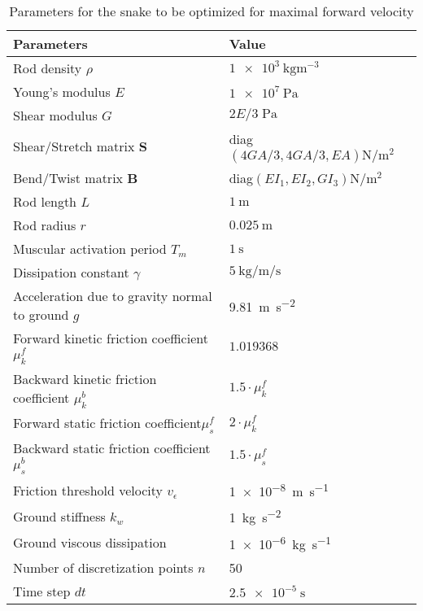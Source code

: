 \documentclass[11pt]{article}
\begin{document}
\begin{table}[htbp]
\caption{\label{tab_opt_snake_params}
Parameters for the snake to be optimized for maximal forward velocity}
\centering
\begin{tabular}{ll}
\toprule
Parameters & Value\\
\midrule
Rod density \(\rho\) & \(\SI{1e3}{\kg \m^{-3}}\)\\
Young's modulus \(E\) & \(\SI{1e7}{\Pa}\)\\
Shear modulus \(G\) & \(2E/3\;\si{\Pa}\)\\
Shear/Stretch matrix \(\mathbf{S}\) & diag\((4GA/3, 4GA/3, EA) \si{\N\per\m^2}\)\\
Bend/Twist matrix \(\mathbf{B}\) & diag\((EI_1, EI_2, GI_3) \si{\N\per\m^2}\)\\
Rod length \(L\) & \(\SI{1}{\m}\)\\
Rod radius \(r\) & \(\SI{0.025}{\m}\)\\
Muscular activation period \(T_m\) & \(\SI{1}{\second}\)\\
Dissipation constant \(\gamma\) & \(\SI{5}{\kg\per\m\per\second}\)\\
Acceleration due to gravity normal to ground \(g\) & \SI{9.81}{\m \per \s^2}\\
Forward kinetic friction coefficient\(\mu^f_k\) & \(1.019368\)\\
Backward kinetic friction coefficient \(\mu^b_k\) & \(1.5 \cdot  \mu^f_k\)\\
Forward static friction coefficient\(\mu^f_s\) & \(2 \cdot  \mu^f_k\)\\
Backward static friction coefficient \(\mu^b_s\) & \(1.5 \cdot  \mu^f_s\)\\
Friction threshold velocity \(v_{\epsilon}\) & \SI{1e-8}{\m\per\s}\\
Ground stiffness \(k_w\) & \SI{1}{\kg \per \s^2}\\
Ground viscous dissipation & \SI{1e-6}{\kg \per \s}\\
Number of discretization points \(n\) & 50\\
Time step \(dt\) & \(\SI{2.5e-5}{\second}\)\\
\bottomrule
\end{tabular}
\end{table}
\end{document}
